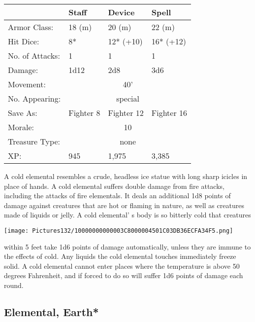 \documentclass[a4paper,twoside,openany,10pt]{book}
\begin{document}
\begin{multicols}{2}
\begin{tabularx}{0.48\textwidth}{@{}lllX@{}}
& Staff & Device & Spell \\\hline
Armor Class: & 18 (m) & 20 (m) & 22 (m) \\\hline
Hit Dice: & 8* & 12* (+10) & 16* (+12) \\\hline
No. of Attacks: & 1 & 1 & 1 \\\hline
Damage: & 1d12 & 2d8 & 3d6 \\\hline
Movement: & \multicolumn{3}{c}{40'} \\\hline
No. Appearing: &\multicolumn{3}{c}{special} \\\hline
Save As: & Fighter 8 & Fighter 12 & Fighter 16 \\\hline
Morale: & \multicolumn{3}{c}{10} \\\hline
Treasure Type: & \multicolumn{3}{c}{none} \\\hline
XP: & 945 & 1,975 & 3,385 \\\hline
\end{tabularx}\medskip

A cold elemental resembles a crude, headless ice statue with long sharp icicles in place of hands. A cold elemental suffers double damage from fire attacks, including the attacks of fire elementals. It deals an additional 1d8 points of damage against creatures that are hot or flaming in nature, as well as creatures made of liquids or jelly. A cold elemental' s body is so bitterly cold that creatures

\begin{center}
	\texttt{[image: Pictures132/10000000000003C8000004501C03DB36ECFA34F5.png]}
\end{center}

within 5 feet take 1d6 points of damage automatically, unless they are immune to the effects of cold. Any liquids the cold elemental touches immediately freeze solid. A cold elemental cannot enter places where the temperature is above 50 degrees Fahrenheit, and if forced to do so will suffer 1d6 points of damage each round.


\subsection*{Elemental, Earth*}\label{elemental-earth}


\end{multicols}
\end{document}
